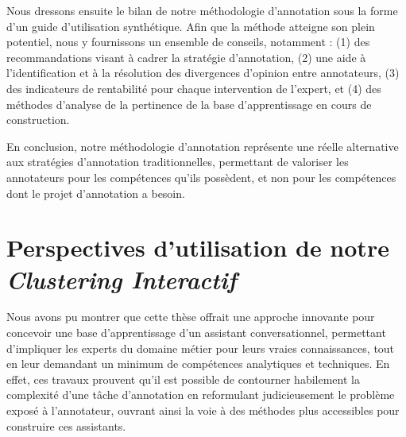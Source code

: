 		Nous dressons ensuite le bilan de notre méthodologie d'annotation sous la forme d'un guide d'utilisation synthétique.
		Afin que la méthode atteigne son plein potentiel, nous y fournissons un ensemble de conseils, notamment : (1) des recommandations visant à cadrer la stratégie d'annotation, (2) une aide à l'identification et à la résolution des divergences d'opinion entre annotateurs, (3) des indicateurs de rentabilité pour chaque intervention de l'expert, et (4) des méthodes d'analyse de la pertinence de la base d'apprentissage en cours de construction.
		
		En conclusion, notre méthodologie d'annotation représente une réelle alternative aux stratégies d'annotation traditionnelles, permettant de valoriser les annotateurs pour les compétences qu'ils possèdent, et non pour les compétences dont le projet d'annotation a besoin.
		
		
	\section*{Perspectives d'utilisation de notre \textit{Clustering Interactif}}
		
		Nous avons pu montrer que cette thèse offrait une approche innovante pour concevoir une base d'apprentissage d'un assistant conversationnel, permettant d'impliquer les experts du domaine métier pour leurs vraies connaissances, tout en leur demandant un minimum de compétences analytiques et techniques.
		En effet, ces travaux prouvent qu'il est possible de contourner habilement la complexité d'une tâche d'annotation en reformulant judicieusement le problème exposé à l'annotateur, ouvrant ainsi la voie à des méthodes plus accessibles pour construire ces assistants.

